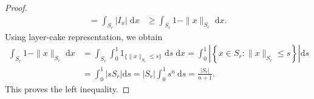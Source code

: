 \documentclass[10pt,a4paper]{amsart}
\begin{document}
\begin{proof}
$$\begin{aligned}
=\int_{S_r}\left|I_x\right|  \;\mathrm{d} x
& \geq \int_{S_r}1-\|x\|_{S_r}  \;\mathrm{d} x.
\end{aligned}
$$
Using layer-cake representation, we obtain
\begin{align}
\int_{S_r}1-\|x\|_{S_r}  \;\mathrm{d} x &= \int_{S_r}\int_0^1 {1}_{\{\|x\|_{S_r}  \leq s\}} \;\mathrm{d} s \;\mathrm{d} x
 =\int_0^1\left|\left\{x \in S_r: \|x\|_{S_r}  \leq s\right\}\right| \mathrm{d} s \\
& =\int_0^1\left|s S_r\right| \mathrm{d} s
 =\left|S_r\right| \int_0^1 s^n \mathrm{~d} s
 =\frac{\left|S_r\right|}{n+1}.
\end{align}
This proves the left inequality.
\end{proof}
\end{document}
